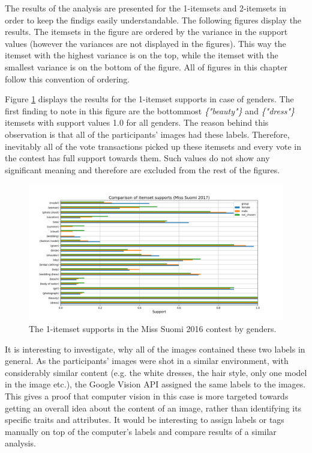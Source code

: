 The results of the analysis are presented for the 1-itemsets and 2-itemsets in order to keep the findigs easily understandable. The following figures display the results. The itemsets in the figure are ordered by the variance in the support values (however the variances are not displayed in the figures). This way the itemset with the highest variance is on the top, while the itemset with the smallest variance is on the bottom of the figure. All of figures in this chapter follow this convention of ordering.

Figure \ref{itemset_supports-gender-Miss_Helsinki-1_itemset} displays the results for the 1-itemset supports in case of genders. The first finding to note in this figure are the bottommost \textit{\{"beauty"\}} and \textit{\{"dress"\}} itemsets with support values 1.0 for all genders. The reason behind this observation is that all of the participants' images had these labels. Therefore, inevitably all of the vote transactions picked up these itemsets and every vote in the contest has full support towards them. Such values do not show any significant meaning and therefore are excluded from the rest of the figures.

\begin{figure}[h] 
    \begin{center}
        \includegraphics[width=1.0\textwidth]{Images/itemset_supports-gender-Miss_Helsinki-1_itemset.png}
        \caption{The 1-itemset supports in the Miss Suomi 2016 contest by genders.}
        \label{itemset_supports-gender-Miss_Helsinki-1_itemset}
    \end{center}
\end{figure}

It is interesting to investigate, why all of the images contained these two labels in general. As the participants' images were shot in a similar environment, with considerably similar content (e.g. the white dresses, the hair style, only one model in the image etc.), the Google Vision API assigned the same labels to the images. This gives a proof that computer vision in this case is more targeted towards getting an overall idea about the content of an image, rather than identifying its specific traits and attributes. It would be interesting to assign labels or tags manually on top of the computer's labels and compare results of a similar analysis.

